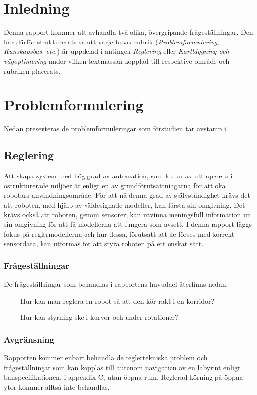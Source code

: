 \documentclass[11pt]{article}
\begin{document}
\begin{flushleft}

\section{Inledning} \label{inledning}
Denna rapport kommer att avhandla två olika, övergripande frågeställningar. Den har därför strukturerats så att varje huvudrubrik (\textit{Problemformulering, Kunskapsbas, etc.}) är uppdelad i antingen \textit{Reglering} eller \textit{Kartläggning och vägoptimering} under vilken textmassan kopplad till respektive område och rubriken placerats.

\section{Problemformulering}
Nedan presenteras de problemformuleringar som förstudien tar avstamp i.
\subsection{Reglering}
Att skapa system med hög grad av automation, som klarar av att operera i ostrukturerade miljöer är enligt \cite{intro} %
 en av grundförutsättningarna för att öka robotars användningsområde. För att nå denna grad av självständighet krävs det att roboten, med hjälp av väldesignade modeller, kan förstå sin omgivning. Det krävs också att roboten, genom sensorer, kan utvinna meningsfull information ur sin omgivning för att få modellerna att fungera som avsett. I denna rapport läggs fokus på reglermodellerna och hur dessa, förutsatt att de förses med korrekt sensordata, kan utformas för att styra roboten på ett önskat sätt.

\subsubsection{Frågeställningar}
De frågeställningar som behandlas i rapportens huvuddel återfinns nedan.
\begin{itemize}
	\item [-] Hur kan man reglera en robot så att den kör rakt i en korridor?
	\item [-] Hur kan styrning ske i kurvor och under rotationer?
\end{itemize}

\subsubsection{Avgränsning}
Rapporten kommer enbart behandla de reglertekniska problem och frågeställningar som kan kopplas till autonom navigation av en labyrint enligt banspecifikationen, i appendix C, utan öppna rum. Reglerad körning på öppna ytor kommer alltså inte behandlas.


\end{flushleft}
\end{document}
